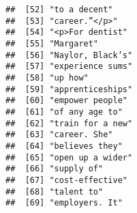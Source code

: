 \documentclass[]{article}
\begin{document}
\begin{verbatim}
##  [52] "to a decent"                                                                                                                              
##  [53] "career.”</p>"                                                                                                                             
##  [54] "<p>For dentist"                                                                                                                           
##  [55] "Margaret"                                                                                                                                 
##  [56] "Naylor, Black’s"                                                                                                                          
##  [57] "experience sums"                                                                                                                          
##  [58] "up how"                                                                                                                                   
##  [59] "apprenticeships"                                                                                                                          
##  [60] "empower people"                                                                                                                           
##  [61] "of any age to"                                                                                                                            
##  [62] "train for a new"                                                                                                                          
##  [63] "career. She"                                                                                                                              
##  [64] "believes they"                                                                                                                            
##  [65] "open up a wider"                                                                                                                          
##  [66] "supply of"                                                                                                                                
##  [67] "cost-effective"                                                                                                                           
##  [68] "talent to"                                                                                                                                
##  [69] "employers. It"                                                                                                                            

\end{verbatim}
\end{document}
